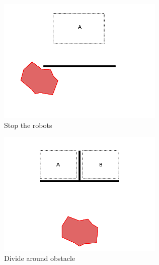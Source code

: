 \documentclass[]{article}
\begin{document}
\begin{figure}
\begin{subfigure}{0.42\textwidth}
		\centering
		\includegraphics[width=\linewidth]{slide_images/Swarm_Robot_Control_-_Unknown_Number_of_Robots_0009.png}
		\caption{Stop the robots}
		\label{fig:sub1}
	\end{subfigure}%
	\begin{subfigure}{0.42\textwidth}
		\centering
		\includegraphics[width=\linewidth]{slide_images/Swarm_Robot_Control_-_Unknown_Number_of_Robots_0011.png}
		\caption{Divide around obstacle}
		\label{fig:sub2}
	\end{subfigure}
	\begin{subfigure}{0.42\textwidth}
		\centering

\end{subfigure}
\end{figure}
\end{document}
